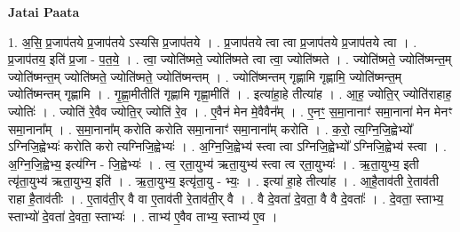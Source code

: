 \documentclass[17pt]{extarticle}
\begin{document}
\textbf{Jatai Paata} \newline

1. अ॒सि॒ प्र॒जाप॑तये प्र॒जाप॑तये ऽस्यसि प्र॒जाप॑तये । . प्र॒जाप॑तये त्वा त्वा प्र॒जाप॑तये प्र॒जाप॑तये त्वा । . प्र॒जाप॑तय॒ इति॑ प्र॒जा - प॒त॒ये॒ । . त्वा॒ ज्योति॑ष्मते॒ ज्योति॑ष्मते त्वा त्वा॒ ज्योति॑ष्मते । . ज्योति॑ष्मते॒ ज्योति॑ष्मन्त॒म् ज्योति॑ष्मन्त॒म् ज्योति॑ष्मते॒ ज्योति॑ष्मते॒ ज्योति॑ष्मन्तम् । . ज्योति॑ष्मन्तम् गृह्णामि गृह्णामि॒ ज्योति॑ष्मन्त॒म् ज्योति॑ष्मन्तम् गृह्णामि । . गृ॒ह्णा॒मीतीति॑ गृह्णामि गृह्णा॒मीति॑ । . इत्या॑हा॒हे तीत्या॑ह । . आ॒ह॒ ज्योति॒र् ज्योति॑राहाह॒ ज्योतिः॑ । . ज्योति॑ रे॒वैव ज्योति॒र् ज्योति॑ रे॒व । . ए॒वैन॑ मेन मे॒वैवैन᳚म् । . ए॒नꣳ॒॒ स॒मा॒नानाꣳ॑ समा॒नाना॑ मेन मेनꣳ समा॒नाना᳚म् । . स॒मा॒नाना᳚म् करोति करोति समा॒नानाꣳ॑ समा॒नाना᳚म् करोति । . क॒रो॒ त्य॒ग्नि॒जि॒ह्वेभ्यो᳚ ऽग्निजि॒ह्वेभ्यः॑ करोति करो त्यग्निजि॒ह्वेभ्यः॑ । . अ॒ग्नि॒जि॒ह्वेभ्य॑ स्त्वा त्वा ऽग्निजि॒ह्वेभ्यो᳚ ऽग्निजि॒ह्वेभ्य॑ स्त्वा । . अ॒ग्नि॒जि॒ह्वेभ्य॒ इत्य॑ग्नि - जि॒ह्वेभ्यः॑ । . त्व॒ र्‌ता॒युभ्य॑ ऋता॒युभ्य॑ स्त्वा त्व र्‌ता॒युभ्यः॑ । . ऋ॒ता॒युभ्य॒ इती त्यृ॑ता॒युभ्य॑ ऋता॒युभ्य॒ इति॑ । . ऋ॒ता॒युभ्य॒ इत्यृ॑ता॒यु - भ्यः॒ । . इत्या॑ हा॒हे तीत्या॑ह । . आ॒है॒ताव॑ती रे॒ताव॑ती राहा है॒ताव॑तीः । . ए॒ताव॑ती॒र् वै वा ए॒ताव॑ती रे॒ताव॑ती॒र् वै । . वै दे॒वता॑ दे॒वता॒ वै वै दे॒वताः᳚ । . दे॒वता॒ स्ताभ्य॒ स्ताभ्यो॑ दे॒वता॑ दे॒वता॒ स्ताभ्यः॑ । . ताभ्य॑ ए॒वैव ताभ्य॒ स्ताभ्य॑ ए॒व । \newline
\end{document}
